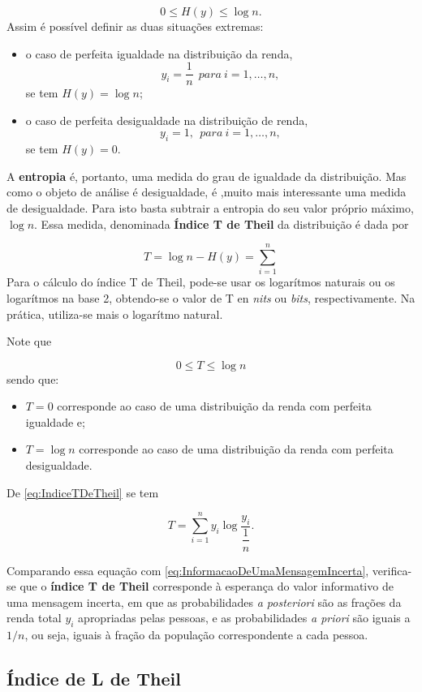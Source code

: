 \documentclass[
]{book}
\begin{document}
\[
  0\leq H(y) \leq \log n.
\]
Assim é possível definir as duas situações extremas:

\begin{itemize}
\item
  o caso de perfeita igualdade na distribuição da renda,
  \[
    y_i = \dfrac{1}{n}~~para~i=1, \ldots, n,
  \]
  se tem \(H(y) = \log n\);
\item
  o caso de perfeita desigualdade na distribuição de renda,
  \[
    y_i = 1,~~para~i=1, \ldots, n,
  \]
  se tem \(H(y) = 0\).
\end{itemize}

A \textbf{entropia} é, portanto, uma medida do grau de igualdade da distribuição. Mas como o objeto de análise é desigualdade, é ,muito mais interessante uma medida de desigualdade. Para isto basta subtrair a entropia do seu valor próprio máximo, \(\log n\). Essa medida, denominada \textbf{Índice T de Theil} da distribuição é dada por

\[
T = \log n - H(y) = \sum_{i=1}^{n}
\label{eq:IndiceTDeTheil}
\]
Para o cálculo do índice T de Theil, pode-se usar os logarítmos naturais ou os logarítmos na base 2, obtendo-se o valor de T en \emph{nits} ou \emph{bits}, respectivamente. Na prática, utiliza-se mais o logarítmo natural.

Note que

\[
  0 \leq T \leq \log n
  \label{eq:IntervaloDoIndiceTDeTheil}
\]
sendo que:

\begin{itemize}
\item
  \(T = 0\) corresponde ao caso de uma distribuição da renda com perfeita igualdade e;
\item
  \(T = \log n\) corresponde ao caso de uma distribuição da renda com perfeita desigualdade.
\end{itemize}

De \eqref{eq:IndiceTDeTheil} se tem

\[
  T = \sum_{i=1}^{n}y_i \log \dfrac{y_i}{\dfrac{1}{n}}.
\]

Comparando essa equação com \eqref{eq:InformacaoDeUmaMensagemIncerta}, verifica-se que o \textbf{índice T de Theil} corresponde à esperança do valor informativo de uma mensagem incerta, em que as probabilidades \emph{a posteriori} são as frações da renda total \(y_i\) apropriadas pelas pessoas, e as probabilidades \emph{a priori} são iguais a \(1/n\), ou seja, iguais à fração da população correspondente a cada pessoa.

\hypertarget{uxedndice-de-l-de-theil}{%
\subsection{Índice de L de Theil}\label{uxedndice-de-l-de-theil}}
\end{document}
